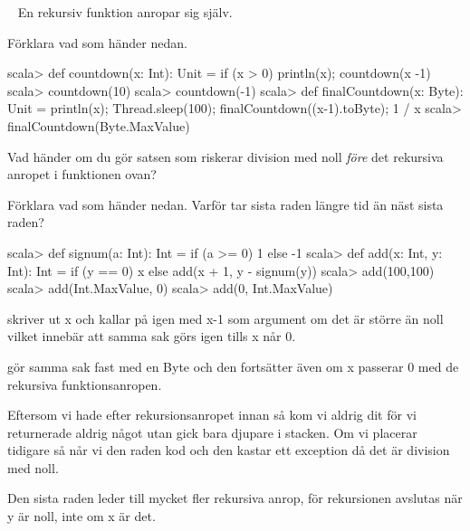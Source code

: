 \QUESTEND






\QUESTBEGIN

\Task  \what~  En rekursiv funktion anropar sig själv.

\Subtask Förklara vad som händer nedan.

\begin{REPL}
scala> def countdown(x: Int): Unit = if (x > 0) {println(x); countdown(x -1)}
scala> countdown(10)
scala> countdown(-1)
scala> def finalCountdown(x: Byte): Unit =
         {println(x); Thread.sleep(100); finalCountdown((x-1).toByte); 1 / x}
scala> finalCountdown(Byte.MaxValue)
\end{REPL}

\Subtask Vad händer om du gör satsen som riskerar division med noll \emph{före} det rekursiva anropet i funktionen  ovan?

\Subtask Förklara vad som händer nedan. Varför tar sista raden längre tid än näst sista raden?
\begin{REPL}
scala> def signum(a: Int): Int = if (a >= 0) 1 else -1
scala> def add(x: Int, y: Int): Int =
         if (y == 0) x else add(x + 1, y - signum(y))
scala> add(100,100)
scala> add(Int.MaxValue, 0)
scala> add(0, Int.MaxValue)
\end{REPL}


\SOLUTION

\TaskSolved \what

\SubtaskSolved
{} skriver ut x och kallar på  igen med x-1 som argument om det är större än noll vilket innebär att samma sak görs igen tills x når 0.

 gör samma sak fast med en Byte och den fortsätter även om x passerar 0 med de rekursiva funktionsanropen.

\SubtaskSolved
Eftersom vi hade  efter rekursionsanropet innan så kom vi aldrig dit för vi returnerade aldrig något utan gick bara djupare i stacken. Om vi placerar  tidigare så når vi den raden kod och den kastar ett exception då det är division med noll.

\SubtaskSolved
Den sista raden leder till mycket fler rekursiva anrop, för rekursionen avslutas när y är noll, inte om x är det.

\QUESTEND





